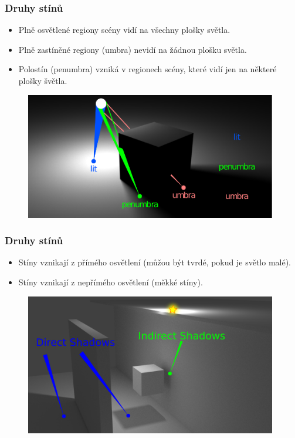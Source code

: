 \begin{frame}
  \frametitle{Druhy stínů}
  \begin{itemize}
    \item Plně osvětlené regiony scény vidí na všechny plošky světla.
    \item Plně zastíněné regiony (umbra) nevidí na žádnou plošku světla.
    \item Polostín (penumbra) vzniká v regionech scény, které vidí jen na některé plošky švětla.
  \end{itemize}
  \begin{figure}[h]
    \includegraphics[width=11cm,keepaspectratio]{pics/shadows/penumbra/penumbra}
  \end{figure}
\end{frame}

\begin{frame}
  \frametitle{Druhy stínů}
  \begin{itemize}
    \item Stíny vznikají z přímého osvětlení (můžou být tvrdé, pokud je světlo malé).
    \item Stíny vznikají z nepřímého osvětlení (měkké stíny).
  \end{itemize}
  \begin{figure}[h]
    \includegraphics[width=11cm,keepaspectratio]{pics/shadows/indirectShadow/indirectShadows.pdf}
  \end{figure}
\end{frame}

